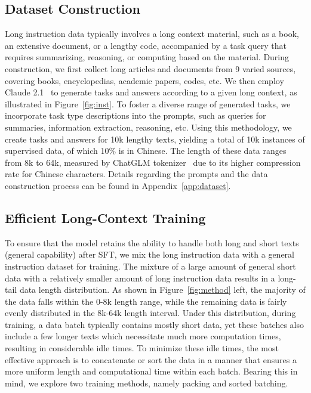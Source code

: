\subsection{Dataset Construction}
\label{sec:data}
Long instruction data typically involves a long context material, such as a book, an extensive document, or a lengthy code, accompanied by a task query that requires summarizing, reasoning, or computing based on the material.
During construction, we first collect long articles and documents from 9 varied sources, covering books, encyclopedias, academic papers, codes, etc.
We then employ Claude 2.1~\cite{claude} to generate tasks and answers according to a given long context, as illustrated in Figure~\ref{fig:inst}.
To foster a diverse range of generated tasks, we incorporate task type descriptions into the prompts, such as queries for summaries, information extraction, reasoning, etc. 
Using this methodology, we create tasks and answers for 10k lengthy texts, yielding a total of 10k instances of supervised data, of which 10\% is in Chinese.
The length of these data ranges from 8k to 64k, measured by ChatGLM tokenizer~\cite{zeng2022glm} due to its higher compression rate for Chinese characters.
Details regarding the prompts and the data construction process can be found in Appendix~\ref{app:dataset}.

\subsection{Efficient Long-Context Training}
To ensure that the model retains the ability to handle both long and short texts (general capability) after SFT, we mix the long instruction data with a general instruction dataset for training.
The mixture of a large amount of general short data with a relatively smaller amount of long instruction data results in a long-tail data length distribution. As shown in Figure~\ref{fig:method} left, the majority of the data falls within the 0-8k length range, while the remaining data is fairly evenly distributed in the 8k-64k length interval.
Under this distribution, during training, a data batch typically contains mostly short data, yet these batches also include a few longer texts which necessitate much more computation times, resulting in considerable idle times.
To minimize these idle times, the most effective approach is to concatenate or sort the data in a manner that ensures a more uniform length and computational time within each batch.
Bearing this in mind, we explore two training methods, namely packing and sorted batching.

